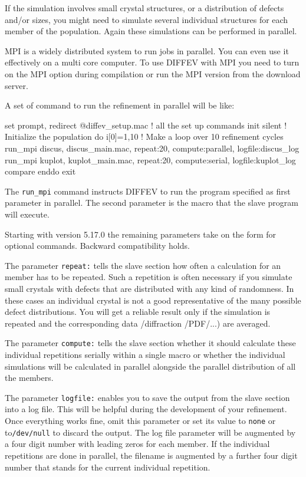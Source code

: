 If the simulation involves small crystal structures, or a distribution of
defects and/or sizes, you might need to simulate several individual 
structures for each member of the population. Again these simulations can be
performed in parallel.

MPI is a widely distributed system to run jobs in parallel. You can even 
use it effectively on a multi core computer. To use DIFFEV with MPI you need 
to turn on the MPI option during compilation or run the MPI version from
the \Discus download server.

A set of command to run the refinement in parallel will be like:

\begin{MacVerbatim}
   set prompt, redirect
   @diffev_setup.mac       ! all the set up commands 
   init silent             ! Initialize the population
   do i[0]=1,10            ! Make a loop over 10 refinement cycles
      run_mpi discus, discus_main.mac, repeat:20, compute:parallel, logfile:discus_log
      run_mpi kuplot, kuplot_main.mac, repeat:20, compute:serial,   logfile:kuplot_log
      compare
   enddo
   exit
\end{MacVerbatim}
 
The {\tt run\_mpi} command instructs DIFFEV to run the program specified as
first parameter in parallel. The second parameter is the macro that the slave 
program will execute. 

Starting with version 5.17.0 the remaining parameters take on the form for
optional commands. Backward compatibility holds.

The parameter {\tt repeat:} tells the slave section how often a calculation for 
an member has to be repeated. Such a repetition is often necessary if you simulate
small crystals with defects that are distributed with any kind of randomness. In
these cases an individual crystal is not a good representative of the many 
possible defect distributions. You will get a reliable result only if the simulation
is repeated and the corresponding data /diffraction /PDF/...) are averaged.

The parameter {\tt compute:} tells the slave section whether it should calculate
these individual repetitions serially within a single macro or whether the 
individual simulations will be calculated in parallel alongside the parallel
distribution of all the members.

The parameter {\tt logfile:} enables you to save the output from the slave 
section into a log file. This will be helpful during the development of your
refinement. Once everything works fine, omit this parameter or set its 
value to {\tt none} or to{\tt /dev/null} to discard the output. The
log file parameter will be augmented by a four digit number with leading zeros 
for each member. If the individual repetitions are done in parallel, the 
filename is augmented by a further four digit number that stands for the 
current individual repetition.


